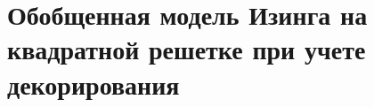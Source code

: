 \chapter{Обобщенная модель Изинга на квадратной решетке при учете декорирования}\label{ch:ch6}



\clearpage
